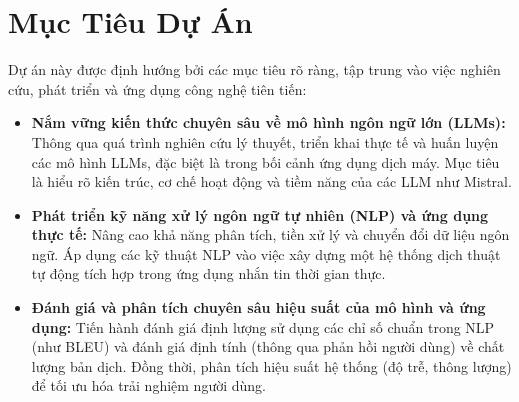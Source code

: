 \section{Mục Tiêu Dự Án}

Dự án này được định hướng bởi các mục tiêu rõ ràng, tập trung vào việc nghiên cứu, phát triển và ứng dụng công nghệ tiên tiến:

\begin{itemize}

    \item \textbf{Nắm vững kiến thức chuyên sâu về mô hình ngôn ngữ lớn (LLMs):} Thông qua quá trình nghiên cứu lý thuyết, triển khai thực tế và huấn luyện các mô hình LLMs, đặc biệt là trong bối cảnh ứng dụng dịch máy. Mục tiêu là hiểu rõ kiến trúc, cơ chế hoạt động và tiềm năng của các LLM như Mistral.
    \item \textbf{Phát triển kỹ năng xử lý ngôn ngữ tự nhiên (NLP) và ứng dụng thực tế:} Nâng cao khả năng phân tích, tiền xử lý và chuyển đổi dữ liệu ngôn ngữ. Áp dụng các kỹ thuật NLP vào việc xây dựng một hệ thống dịch thuật tự động tích hợp trong ứng dụng nhắn tin thời gian thực.
    \item \textbf{Đánh giá và phân tích chuyên sâu hiệu suất của mô hình và ứng dụng:} Tiến hành đánh giá định lượng sử dụng các chỉ số chuẩn trong NLP (như BLEU) và đánh giá định tính (thông qua phản hồi người dùng) về chất lượng bản dịch. Đồng thời, phân tích hiệu suất hệ thống (độ trễ, thông lượng) để tối ưu hóa trải nghiệm người dùng.

\end{itemize}